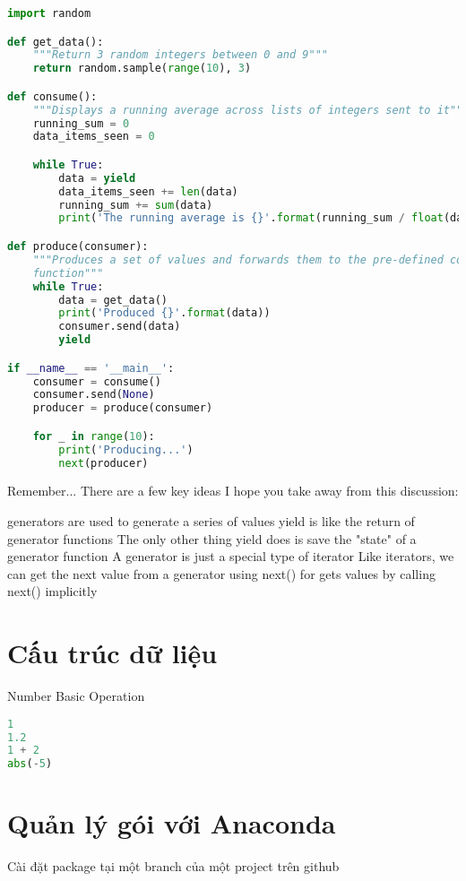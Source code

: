 \begin{lstlisting}[language=Python]
import random

def get_data():
    """Return 3 random integers between 0 and 9"""
    return random.sample(range(10), 3)

def consume():
    """Displays a running average across lists of integers sent to it"""
    running_sum = 0
    data_items_seen = 0

    while True:
        data = yield
        data_items_seen += len(data)
        running_sum += sum(data)
        print('The running average is {}'.format(running_sum / float(data_items_seen)))

def produce(consumer):
    """Produces a set of values and forwards them to the pre-defined consumer
    function"""
    while True:
        data = get_data()
        print('Produced {}'.format(data))
        consumer.send(data)
        yield

if __name__ == '__main__':
    consumer = consume()
    consumer.send(None)
    producer = produce(consumer)

    for _ in range(10):
        print('Producing...')
        next(producer)
\end{lstlisting}

Remember...
There are a few key ideas I hope you take away from this discussion:

generators are used to generate a series of values
yield is like the return of generator functions
The only other thing yield does is save the "state" of a generator function
A generator is just a special type of iterator
Like iterators, we can get the next value from a generator using next()
for gets values by calling next() implicitly

\section{Cấu trúc dữ liệu}

Number
Basic Operation

\begin{lstlisting}[language=Python]
1
1.2
1 + 2
abs(-5)
\end{lstlisting}


\section{Quản lý gói với Anaconda}

\noindent Cài đặt package tại một branch của một project trên github

